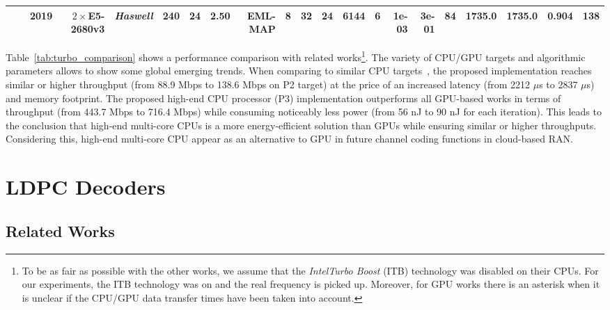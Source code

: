 \begin{table}
\begin{adjustbox}{angle=90}
{{\begin{tabular}{|r|r|r||r|r|r|r|r|r|r|r|r|r|r||r|r|r|r||r|r|r|}
                                                                 & \cite{LeGal2019a}               & 2019                  & $2\times$E5-2680v3       & \textit{Haswell}                 & 240                  & 24                 & 2.50                   & EML-MAP                  & 8                   & 32                  & 24                  & 6144                  & 6                  & 1e-03                         & 3e-01                    &     84        & 1735.0           & 1735.0         & 0.904         &    138             \\
  \hline
  \end{tabular}
  }}
  \end{adjustbox}
\end{table}

Table~\ref{tab:turbo_comparison} shows a performance comparison with related
works\footnote{To be as fair as possible with the other works, we assume that
the \emph{Intel\R Turbo Boost} (ITB) technology was disabled on their CPUs. For
our experiments, the ITB technology was on and the real frequency is picked up.
Moreover, for GPU works there is an asterisk when it is unclear if the CPU/GPU
data transfer times have been taken into account.}. The variety of CPU/GPU
targets and algorithmic parameters allows to show some global emerging trends.
When comparing to similar CPU targets~\cite{Zhang2012,Wu2013}, the proposed
implementation reaches similar or higher throughput (from 88.9 Mbps to 138.6
Mbps on P2 target) at the price of an increased latency (from 2212 $\mu$s to
2837 $\mu$s) and memory footprint. The proposed high-end CPU processor (P3)
implementation outperforms all GPU-based works in terms of throughput (from
443.7 Mbps to 716.4 Mbps) while consuming noticeably less power (from 56 nJ to
90 nJ for each iteration). This leads to the conclusion that high-end multi-core
CPUs is a more energy-efficient solution than GPUs while ensuring similar or
higher throughputs. Considering this, high-end multi-core CPU appear as an
alternative to GPU in future channel coding functions in cloud-based RAN.

\section{LDPC Decoders}

\subsection{Related Works}


